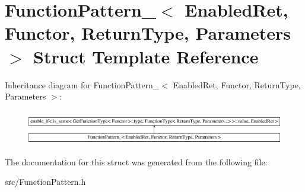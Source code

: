 \hypertarget{struct_function_pattern__}{\section{Function\-Pattern\-\_\-$<$ Enabled\-Ret, Functor, Return\-Type, Parameters $>$ Struct Template Reference}
\label{struct_function_pattern__}
}
Inheritance diagram for Function\-Pattern\-\_\-$<$ Enabled\-Ret, Functor, Return\-Type, Parameters $>$\-:\begin{figure}[H]
\begin{center}
\leavevmode
\includegraphics[height=1.546961cm]{struct_function_pattern__}
\end{center}
\end{figure}


The documentation for this struct was generated from the following file\-:\begin{DoxyCompactItemize}
\item 
src/Function\-Pattern.\-h\end{DoxyCompactItemize}
